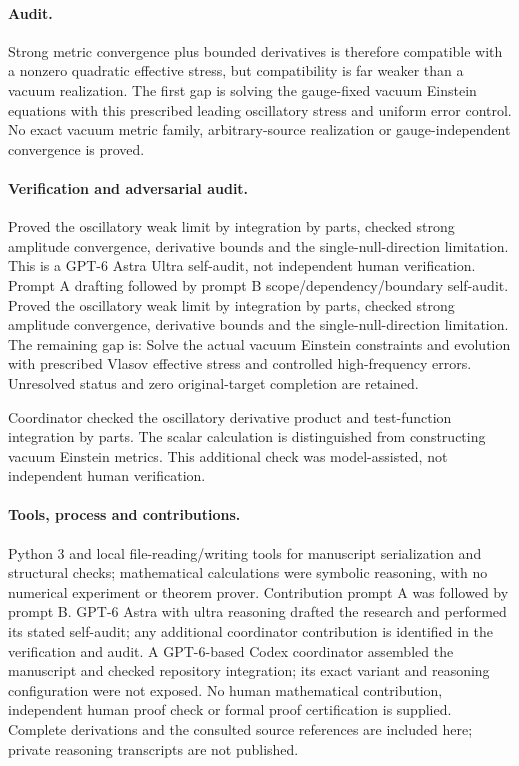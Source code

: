 \documentclass[11pt]{article}
\begin{document}
\paragraph{Audit.} Strong metric convergence plus bounded derivatives is therefore compatible with a nonzero quadratic effective stress, but compatibility is far weaker than a vacuum realization. The first gap is solving the gauge-fixed vacuum Einstein equations with this prescribed leading oscillatory stress and uniform error control. No exact vacuum metric family, arbitrary-source realization or gauge-independent convergence is proved.

\paragraph{Verification and adversarial audit.}
Proved the oscillatory weak limit by integration by parts, checked strong amplitude convergence, derivative bounds and the single-null-direction limitation. This is a GPT-6 Astra Ultra self-audit, not independent human verification. Prompt A drafting followed by prompt B scope/dependency/boundary self-audit. Proved the oscillatory weak limit by integration by parts, checked strong amplitude convergence, derivative bounds and the single-null-direction limitation. The remaining gap is: Solve the actual vacuum Einstein constraints and evolution with prescribed Vlasov effective stress and controlled high-frequency errors. Unresolved status and zero original-target completion are retained.

Coordinator checked the oscillatory derivative product and test-function integration by parts. The scalar calculation is distinguished from constructing vacuum Einstein metrics. This additional check was model-assisted, not independent human verification.

\paragraph{Tools, process and contributions.}
Python 3 and local file-reading/writing tools for manuscript serialization and structural checks; mathematical calculations were symbolic reasoning, with no numerical experiment or theorem prover. Contribution prompt A was followed by prompt B. GPT-6 Astra with ultra reasoning drafted the research and performed its stated self-audit; any additional coordinator contribution is identified in the verification and audit. A GPT-6-based Codex coordinator assembled the manuscript and checked repository integration; its exact variant and reasoning configuration were not exposed. No human mathematical contribution, independent human proof check or formal proof certification is supplied. Complete derivations and the consulted source references are included here; private reasoning transcripts are not published.
\end{document}
